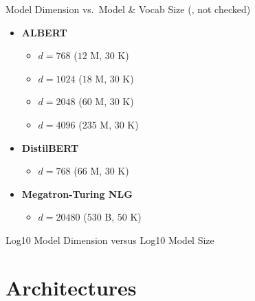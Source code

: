 \begin{slide}[\slideopts,toc={Model Dimension}]{Model Dimension vs.~Model \& Vocab Size
(, not checked)}
\begin{multicols}{2}
\begin{itemize}

    \item \textbf{ALBERT}
    \begin{itemize}
        \item $d = 768$ ($12$ M, $30$ K)
        \item $d = 1024$ ($18$ M, $30$ K)
        \item $d = 2048$ ($60$ M, $30$ K)
        \item $d = 4096$ ($235$ M, $30$ K)
    \end{itemize}

    \item \textbf{DistilBERT}
    \begin{itemize}
        \item $d = 768$ ($66$ M, $30$ K)
    \end{itemize}

    \item \textbf{Megatron-Turing NLG}
    \begin{itemize}
        \item $d = 20480$ ($530$ B, $50$ K)
    \end{itemize}

\end{itemize}
\end{multicols}

\end{slide}

\begin{slidewhite}[\slideopts,toc={}]{Log10 Model Dimension versus Log10 Model Size}

\vspace{-2em}


\end{slidewhite}


\section[\sectopts,toc={Architectures}]{Architectures}


